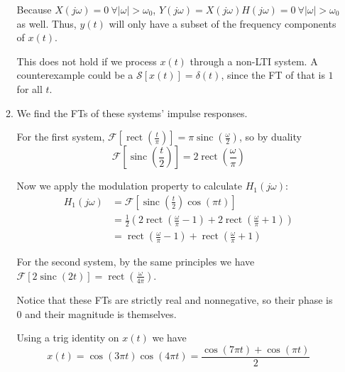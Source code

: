 \documentclass[12pt]{article}
\newcommand{\rect}{\operatorname{rect}}
\newcommand{\sinc}{\operatorname{sinc}}
\newcommand{\ft}[1]{\mathcal{F}\left[#1\right]}
\begin{document}
\begin{enumerate}
\begin{enumerate}
                        Because $X(j\omega)=0\ \forall |\omega|>\omega_0$,
                        $Y(j\omega)=X(j\omega)H(j\omega)=0\ \forall |\omega|>\omega_0$ as well.
                        Thus, $y(t)$ will only have a subset of the frequency components of $x(t)$.

                        This does not hold if we process $x(t)$ through a non-LTI system.
                        A counterexample could be a $\mathcal{S}[x(t)]=\delta(t)$,
                        since the FT of that is $1$ for all $t$.
                  \item We find the FTs of these systems' impulse responses.

                        For the first system,
                        $\ft{\rect\left(\frac{t}{\pi}\right)}=\pi\sinc\left(\frac{\omega}{2}\right)$,
                        so by duality
                        \[\ft{\sinc\left(\frac{t}{2}\right)}=2\rect\left(\frac{\omega}{\pi}\right)\]

                        Now we apply the modulation property to calculate $H_1(j\omega)$:
                        \begin{align*}
                              H_1(j\omega)
                               & = \ft{\sinc\left(\frac{t}{2}\right)\cos(\pi t)}                                                           \\
                               & = \frac{1}{2}\left(2\rect\left(\frac{\omega}{\pi}-1\right)+2\rect\left(\frac{\omega}{\pi}+1\right)\right) \\
                               & = \rect\left(\frac{\omega}{\pi}-1\right)+\rect\left(\frac{\omega}{\pi}+1\right)
                        \end{align*}

                        For the second system, by the same principles we have
                        $\ft{2\sinc(2t)}=\rect\left(\frac{\omega}{4\pi}\right)$.

                        Notice that these FTs are strictly real and nonnegative,
                        so their phase is $0$ and their magnitude is themselves.

                        Using a trig identity on $x(t)$ we have
                        \[x(t)=\cos(3\pi t)\cos(4\pi t)=\frac{\cos(7\pi t)+\cos(\pi t)}{2}\]


\end{enumerate}
\end{enumerate}
\end{document}
